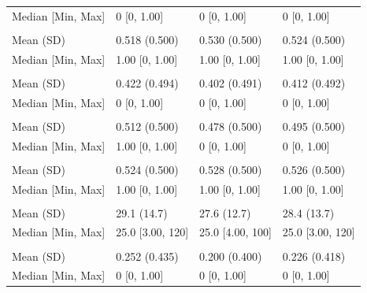 \documentclass[12pt]{article}
\newenvironment{knitrout}{}{} %
\begin{document}
\begin{knitrout}
\begin{tabular}[t]{llll}
\hspace{1em}Median [Min, Max] & 0 [0, 1.00] & 0 [0, 1.00] & 0 [0, \vphantom{2} 1.00]\\
\addlinespace[0.3em]
\multicolumn{4}{l}{\textbf{z2}}\\
\hspace{1em}Mean (SD) & 0.518 (0.500) & 0.530 (0.500) & 0.524 (0.500)\\
\hspace{1em}Median [Min, Max] & 1.00 [0, 1.00] & 1.00 [0, 1.00] & 1.00 [0, \vphantom{1} 1.00]\\
\addlinespace[0.3em]
\multicolumn{4}{l}{\textbf{z3}}\\
\hspace{1em}Mean (SD) & 0.422 (0.494) & 0.402 (0.491) & 0.412 (0.492)\\
\hspace{1em}Median [Min, Max] & 0 [0, 1.00] & 0 [0, 1.00] & 0 [0, \vphantom{1} 1.00]\\
\addlinespace[0.3em]
\multicolumn{4}{l}{\textbf{z4}}\\
\hspace{1em}Mean (SD) & 0.512 (0.500) & 0.478 (0.500) & 0.495 (0.500)\\
\hspace{1em}Median [Min, Max] & 1.00 [0, 1.00] & 0 [0, 1.00] & 0 [0, 1.00]\\
\addlinespace[0.3em]
\multicolumn{4}{l}{\textbf{z5}}\\
\hspace{1em}Mean (SD) & 0.524 (0.500) & 0.528 (0.500) & 0.526 (0.500)\\
\hspace{1em}Median [Min, Max] & 1.00 [0, 1.00] & 1.00 [0, 1.00] & 1.00 [0, 1.00]\\
\addlinespace[0.3em]
\multicolumn{4}{l}{\textbf{size}}\\
\hspace{1em}Mean (SD) & 29.1 (14.7) & 27.6 (12.7) & 28.4 (13.7)\\
\hspace{1em}Median [Min, Max] & 25.0 [3.00, 120] & 25.0 [4.00, 100] & 25.0 [3.00, 120]\\
\addlinespace[0.3em]
\multicolumn{4}{l}{\textbf{grade3}}\\
\hspace{1em}Mean (SD) & 0.252 (0.435) & 0.200 (0.400) & 0.226 (0.418)\\
\hspace{1em}Median [Min, Max] & 0 [0, 1.00] & 0 [0, 1.00] & 0 [0, 1.00]\\

\end{tabular}
\end{knitrout}
\end{document}
